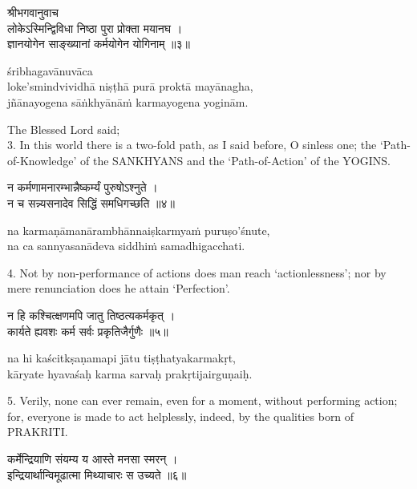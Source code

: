 \begin{gitaverse}
श्रीभगवानुवाच \\
लोकेऽस्मिन्द्विविधा निष्ठा पुरा प्रोक्ता मयानघ । \\
ज्ञानयोगेन साङ्ख्यानां कर्मयोगेन योगिनाम् ॥३॥
\end{gitaverse}

\begin{transliteration}
śribhagavānuvāca \\
loke'smindvividhā niṣṭhā purā proktā mayānagha, \\
jñānayogena sāṅkhyānāṁ karmayogena yoginām.
\end{transliteration}

The Blessed Lord said; \\
3. In this world there is a two-fold path, as I said before, O sinless one; the
`Path-of-Knowledge' of the SANKHYANS and the `Path-of-Action' of the YOGINS.\@

\begin{gitaverse}
न कर्मणामनारम्भान्नैष्कर्म्यं पुरुषोऽश्नुते । \\
न च सन्न्यसनादेव सिद्धिं समधिगच्छति ॥४॥
\end{gitaverse}

\begin{transliteration}
na karmaṇāmanārambhānnaiṣkarmyaṁ puruṣo'śnute, \\
na ca sannyasanādeva siddhiṁ samadhigacchati.
\end{transliteration}

4. Not by non-performance of actions does man reach `actionlessness'; nor by
mere renunciation does he attain `Perfection'.

\begin{gitaverse}
न हि कश्चित्क्षणमपि जातु तिष्ठत्यकर्मकृत् । \\
कार्यते ह्यवशः कर्म सर्वः प्रकृतिजैर्गुणैः ॥५॥
\end{gitaverse}

\begin{transliteration}
na hi kaścitkṣaṇamapi jātu tiṣṭhatyakarmakṛt, \\
kāryate hyavaśaḥ karma sarvaḥ prakṛtijairguṇaiḥ.
\end{transliteration}

5. Verily, none can ever remain, even for a moment, without performing action;
for, everyone is made to act helplessly, indeed, by the qualities born of
PRAKRITI.\@

\begin{gitaverse}
कर्मेन्द्रियाणि संयम्य य आस्ते मनसा स्मरन् । \\
इन्द्रियार्थान्विमूढात्मा मिथ्याचारः स उच्यते ॥६॥
\end{gitaverse}

